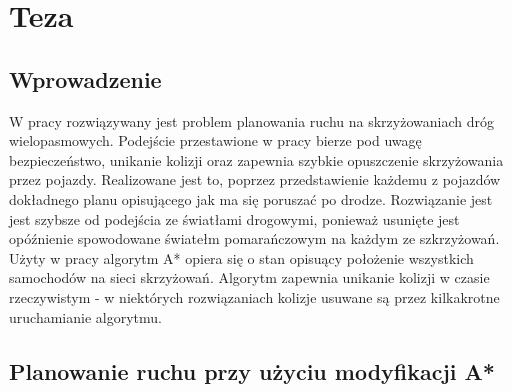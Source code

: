 \chapter{Teza} \label{chap:thesis}


\section{Wprowadzenie}

W pracy rozwiązywany jest problem planowania ruchu na skrzyżowaniach dróg wielopasmowych. Podejście przestawione w pracy bierze pod uwagę bezpieczeństwo, unikanie kolizji oraz zapewnia szybkie opuszczenie skrzyżowania przez pojazdy. Realizowane jest to, poprzez przedstawienie każdemu z pojazdów dokładnego planu opisującego jak ma się poruszać po drodze. Rozwiązanie jest jest szybsze od podejścia ze światłami drogowymi, ponieważ usunięte jest opóźnienie spowodowane światełm pomarańczowym na każdym ze szkrzyżowań. Użyty w pracy algorytm A* opiera się o stan opisuący położenie wszystkich samochodów na sieci skrzyżowań. Algorytm zapewnia unikanie kolizji w czasie rzeczywistym - w niektórych rozwiązaniach kolizje usuwane są przez kilkakrotne uruchamianie algorytmu.
\section{Planowanie ruchu przy użyciu modyfikacji A*}

